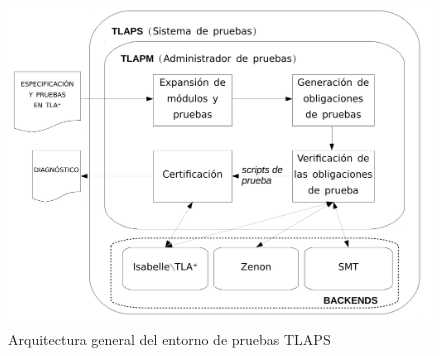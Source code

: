 \documentclass[spanish]{llncs}
\begin{document}
\begin{figure}[H]
  \includegraphics[scale=0.4]{esquema-informe-ingsoft2}
  \caption{Arquitectura general del entorno de pruebas TLAPS}
\end{figure}
\end{document}
